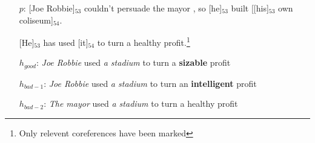 \begin{example}\label{ex:ws-coref}
\begin{itemize}
  \item[$p$:] [Joe Robbie]$_{53}$ couldn't persuade the mayor , so [he]$_{53}$ built [[his]$_{53}$ own coliseum]$_{54}$. 
  \item[] [He]$_{53}$ has used [it]$_{54}$ to turn a healthy profit.\footnote{Only relevent coreferences have been marked}
  \item[$h_{good}$:] {\it Joe Robbie} used {\it a stadium} to turn a {\bf sizable} profit
  \item[$h_{bad-1}$:] {\it Joe Robbie} used {\it a stadium} to turn an {\bf intelligent} profit
  \item[$h_{bad-2}$:] {\it The mayor} used {\it a stadium} to turn a healthy profit
\end{itemize}
\end{example}
